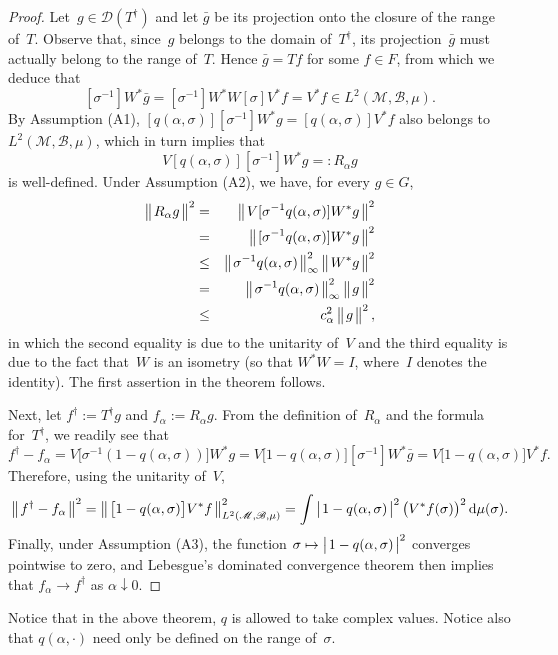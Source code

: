 \documentclass[a4paper]{article}
\def\B{\mathscr{B}}
\def\D{\mathscr{D}}
\def\M{\mathscr{M}}
\def\ud{\,\mathrm{d}}
\def\vphan{\vphantom{\bigl|}}
\def\modc#1{
    \left|
    \mskip 2mu #1 \vphan \mskip 2mu
    \right|
    }
\def\normc#1{
    \left\|
    \mskip 2mu #1 \vphan \mskip 2mu
    \right\|
    }
\begin{document}
\begin{proof}
Let~$g\in\D(T^\dagger)$ and let $\bar{g}$ be its projection onto the
closure of the range of~$T$. Observe that, since~$g$
belongs to the domain of~$T^\dagger$, its projection~$\bar{g}$
must actually belong to the range of~$T$. Hence $\bar{g}=Tf$
for some $f\in F$, from which we deduce that
$$
[\sigma^{-1}]W^*\bar{g}=
[\sigma^{-1}]W^*W[\sigma]V^*f=
V^*f\in L^2(\M,\B,\mu).
$$
By Assumption (A1), $[q(\alpha,\sigma)][\sigma^{-1}]W^*g=[q(\alpha,\sigma)]V^*f$
also belongs to $L^2(\M,\B,\mu)$, which in turn implies that
$$
V[q(\alpha,\sigma)][\sigma^{-1}]W^*g=:R_\alpha g
$$
is well-defined.
Under Assumption (A2), we have, for every $g\in G$,
\begin{eqnarray*}
\normc{R_\alpha g}^2
&=&
\normc{V[\sigma^{-1}q(\alpha,\sigma)]W^*g}^2\\
&=&
\normc{[\sigma^{-1}q(\alpha,\sigma)]W^*g}^2\\
&\leq&
\normc{\sigma^{-1}q(\alpha,\sigma)}_\infty^2\normc{W^*g}^2\\
&=&
\normc{\sigma^{-1}q(\alpha,\sigma)}_\infty^2\normc{g}^2\\
&\leq&
c_\alpha^2\normc{g}^2,
\end{eqnarray*}
in which the second equality is due to the unitarity of~$V$
and the third equality is due to the fact that~$W$ is an isometry
(so that $W^*W=I$, where~$I$ denotes the identity).
The first assertion in the theorem follows.

Next, let $f^\dagger:= T^\dagger g$ and $f_\alpha:=R_\alpha g$.
From the definition of~$R_\alpha$ and the formula for~$T^\dagger$,
we readily see that
$$
f^\dagger-f_\alpha=
V\big[\sigma^{-1}(1-q(\alpha,\sigma))\big]W^*g=
V\big[1-q(\alpha,\sigma)\big][\sigma^{-1}]W^*\bar{g}=
V\big[1-q(\alpha,\sigma)\big]V^*f.
$$
Therefore, using the unitarity of~$V$, 
$$
\normc{f^\dagger-f_\alpha}^2=
\normc{\big[1-q(\alpha,\sigma)\big]V^*f}_{L^2(\M,\B,\mu)}^2=
\int\modc{1-q(\alpha,\sigma)}^2 \big(V^*f(\sigma)\big)^2\ud\mu(\sigma).
$$
Finally, under Assumption (A3), the function
$\sigma\mapsto \modc{1-q(\alpha,\sigma)}^2$ converges pointwise
to zero, and Lebesgue's dominated convergence theorem then implies
that $f_\alpha\to f^\dagger$ as $\alpha\downarrow 0$.
\end{proof}

Notice that in the above theorem, $q$ is 
allowed to take complex values. Notice also that $q(\alpha,\cdot)$
need only be defined on the range of~$\sigma$.
\end{document}
